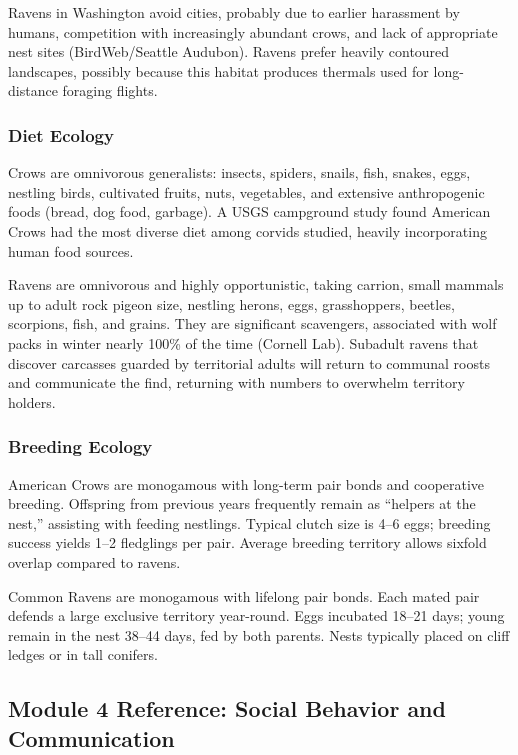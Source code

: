 \documentclass[11pt,letterpaper]{article}
\begin{document}
Ravens in Washington avoid cities, probably due to earlier harassment by humans, competition with increasingly abundant crows, and lack of appropriate nest sites (BirdWeb/Seattle Audubon). Ravens prefer heavily contoured landscapes, possibly because this habitat produces thermals used for long-distance foraging flights.

\subsubsection{Diet Ecology}

Crows are omnivorous generalists: insects, spiders, snails, fish, snakes, eggs, nestling birds, cultivated fruits, nuts, vegetables, and extensive anthropogenic foods (bread, dog food, garbage). A USGS campground study found American Crows had the most diverse diet among corvids studied, heavily incorporating human food sources.

Ravens are omnivorous and highly opportunistic, taking carrion, small mammals up to adult rock pigeon size, nestling herons, eggs, grasshoppers, beetles, scorpions, fish, and grains. They are significant scavengers, associated with wolf packs in winter nearly 100\% of the time (Cornell Lab). Subadult ravens that discover carcasses guarded by territorial adults will return to communal roosts and communicate the find, returning with numbers to overwhelm territory holders.

\subsubsection{Breeding Ecology}

American Crows are monogamous with long-term pair bonds and cooperative breeding. Offspring from previous years frequently remain as ``helpers at the nest,'' assisting with feeding nestlings. Typical clutch size is 4--6 eggs; breeding success yields 1--2 fledglings per pair. Average breeding territory allows sixfold overlap compared to ravens.

Common Ravens are monogamous with lifelong pair bonds. Each mated pair defends a large exclusive territory year-round. Eggs incubated 18--21 days; young remain in the nest 38--44 days, fed by both parents. Nests typically placed on cliff ledges or in tall conifers.

\subsection{Module 4 Reference: Social Behavior and Communication}
\end{document}

